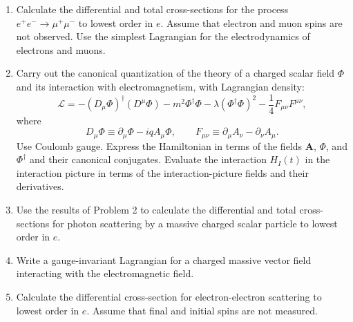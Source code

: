 

\begin{enumerate}
\item Calculate the differential and total cross-sections for the process
$e^+e^-\to\mu^+\mu^-$ to lowest order in $e$. Assume that electron and
muon spins are not observed. Use the simplest Lagrangian for the
electrodynamics of electrons and muons.

\item Carry out the canonical quantization of the theory of a charged scalar
field $\Phi$ and its interaction with electromagnetism, with Lagrangian
density:
\begin{equation*}
\mathcal{L}=-(D_\mu\Phi)^\dagger(D^\mu\Phi)
-m^2\Phi^\dagger\Phi-\lambda(\Phi^\dagger\Phi)^2
-\frac14 F_{\mu\nu}F^{\mu\nu},
\end{equation*}
where
\begin{equation*}
D_\mu\Phi\equiv\partial_\mu\Phi-iqA_\mu\Phi,
\qquad
F_{\mu\nu}\equiv\partial_\mu A_\nu-\partial_\nu A_\mu.
\end{equation*}
Use Coulomb gauge. Express the Hamiltonian in terms of the fields
$\mathbf{A}$, $\Phi$, and $\Phi^\dagger$ and their canonical conjugates.
Evaluate the interaction $H_I(t)$ in the interaction picture in terms of the
interaction-picture fields and their derivatives.

\item Use the results of Problem 2 to calculate the differential and total
cross-sections for photon scattering by a massive charged scalar particle to
lowest order in $e$.

\item Write a gauge-invariant Lagrangian for a charged massive vector field
interacting with the electromagnetic field.

\item Calculate the differential cross-section for electron-electron
scattering to lowest order in $e$. Assume that final and initial spins are not
measured.
\end{enumerate}


